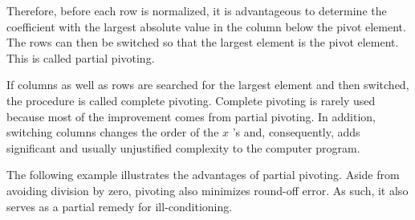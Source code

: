 \documentclass[../main.tex]{subfiles}
\begin{document}
Therefore, before each row is normalized, it is advantageous to determine the coefficient with the largest absolute value in the column below the pivot element. The rows can then be switched so that the largest element is the pivot element. This is called partial pivoting.

If columns as well as rows are searched for the largest element and then switched, the procedure is called complete pivoting. Complete pivoting is rarely used because most of the improvement comes from partial pivoting. In addition, switching columns changes the order of the $x$ 's and, consequently, adds significant and usually unjustified complexity to the computer program.

The following example illustrates the advantages of partial pivoting. Aside from avoiding division by zero, pivoting also minimizes round-off error. As such, it also serves as a partial remedy for ill-conditioning.
\end{document}
